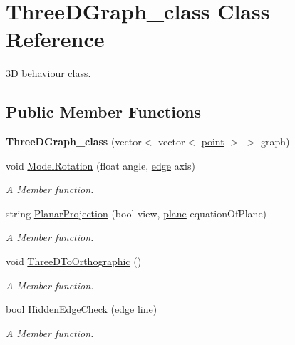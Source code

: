 \hypertarget{classThreeDGraph__class}{}\section{Three\+D\+Graph\+\_\+class Class Reference}
\label{classThreeDGraph__class}


3D behaviour class.  


\subsection*{Public Member Functions}
\begin{DoxyCompactItemize}
\item 
{\bfseries Three\+D\+Graph\+\_\+class} (vector$<$ vector$<$ \hyperlink{structpoint}{point} $>$ $>$ graph)\hypertarget{classThreeDGraph__class_abfa7a7fc904e66a9a76f6b37ba9ca507}{}\label{classThreeDGraph__class_abfa7a7fc904e66a9a76f6b37ba9ca507}

\item 
void \hyperlink{classThreeDGraph__class_a400bececda29db8682455d92872f0a5e}{Model\+Rotation} (float angle, \hyperlink{structedge}{edge} axis)
\begin{DoxyCompactList}\small\item\em A Member function. \end{DoxyCompactList}\item 
string \hyperlink{classThreeDGraph__class_a38e1e26698241cdc5feb2337b061c997}{Planar\+Projection} (bool view, \hyperlink{structplane}{plane} equation\+Of\+Plane)
\begin{DoxyCompactList}\small\item\em A Member function. \end{DoxyCompactList}\item 
void \hyperlink{classThreeDGraph__class_ae69c2ee22498d903d1afa6b988edd1b6}{Three\+D\+To\+Orthographic} ()
\begin{DoxyCompactList}\small\item\em A Member function. \end{DoxyCompactList}\item 
bool \hyperlink{classThreeDGraph__class_a2cfae37ac914b040194e3dae011454d6}{Hidden\+Edge\+Check} (\hyperlink{structedge}{edge} line)
\begin{DoxyCompactList}\small\item\em A Member function. \end{DoxyCompactList}\end{DoxyCompactItemize}
